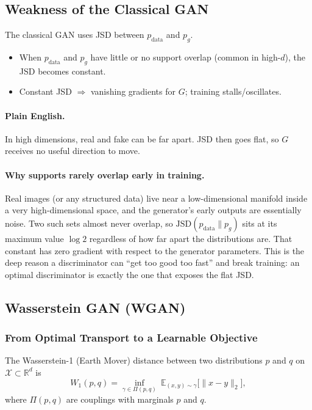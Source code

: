 \documentclass[11pt]{article}
\theoremstyle{remark}
\begin{document}
\subsection{Weakness of the Classical GAN}
The classical GAN uses JSD between $p_{\text{data}}$ and $p_g$.
\begin{itemize}
\item When $p_{\text{data}}$ and $p_g$ have little or no support overlap (common in high-$d$), the JSD becomes constant.
\item Constant JSD $\Rightarrow$ vanishing gradients for $G$; training stalls/oscillates.
\end{itemize}

\paragraph{Plain English.}
In high dimensions, real and fake can be far apart. JSD then goes flat, so $G$ receives no useful direction to move.

\paragraph{Why supports rarely overlap early in training.}
Real images (or any structured data) live near a low-dimensional manifold inside a very high-dimensional space, and the generator's early outputs are essentially noise. Two such sets almost never overlap, so $\mathrm{JSD}(p_{\text{data}}\|p_g)$ sits at its maximum value $\log 2$ regardless of how far apart the distributions are. That constant has zero gradient with respect to the generator parameters. This is the deep reason a discriminator can ``get too good too fast'' and break training: an optimal discriminator is exactly the one that exposes the flat JSD.

\subsection{Wasserstein GAN (WGAN)}

\subsubsection{From Optimal Transport to a Learnable Objective}
The Wasserstein-1 (Earth Mover) distance between two distributions $p$ and $q$ on $\mathcal{X}\subset\mathbb{R}^d$ is
\begin{equation}
W_1(p,q)=\inf_{\gamma\in\Pi(p,q)} \ \mathbb{E}_{(x,y)\sim\gamma}\big[\|x-y\|_2\big],
\label{eq:primal}
\end{equation}
where $\Pi(p,q)$ are couplings with marginals $p$ and $q$.
\end{document}
